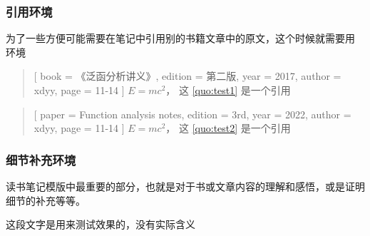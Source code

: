 \documentclass{xdyy-usermanual}
\begin{document}
\subsubsection{ 引用环境  }

为了一些方便可能需要在笔记中引用别的书籍文章中的原文，这个时候就需要用  环境

\begin{vexample}
    \begin{quotation}[
      book    = {《泛函分析讲义》},      %
      edition = {第二版},                %
      year    = {2017},                  %
      author  = {xdyy},                  %
      page    = {11-14}                  %
    ]\label{quo:test1}
      $E = m c^2$， 这 \ref{quo:test1} 是一个引用
    \end{quotation}
\end{vexample}

\begin{vexample}
    \begin{quotation}[
      paper   = {Function analysis notes},   %
      edition = {3rd},                       %
      year    = {2022},                      %
      author  = {xdyy},                      %
      page    = {11-14}                      %
    ]\label{quo:test2}
      $E = m c^2$， 这 \ref{quo:test2} 是一个引用
    \end{quotation}
\end{vexample}



\subsubsection{ 细节补充环境  }

读书笔记模版中最重要的部分，也就是对于书或文章内容的理解和感悟，或是证明细节的补充等等。


\begin{latexcode}
    \begin{detail}[
      paper   = {Function analysis notes},   %
      page = {103},                          %
      author = {许全华},                     %
      edition = {第一版},                    %
      year = {2017},                         %
      original = {                           %
        ...
      }
    ]
      这段文字是用来测试效果的，没有实际含义
    \end{detail}
\end{latexcode}
\end{document}
